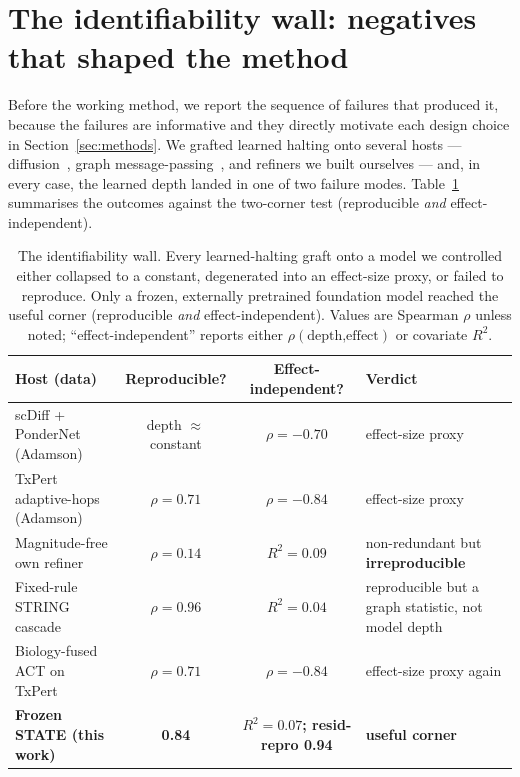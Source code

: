 \documentclass[11pt]{article}
\let\mathrho\rho
\renewcommand{\rho}{\ensuremath{\mathrho}}
\begin{document}
\section{The identifiability wall: negatives that shaped the method}
\label{sec:wall}

Before the working method, we report the sequence of failures that produced it, because the
failures are informative and they directly motivate each design choice in
Section~\ref{sec:methods}. We grafted learned halting onto several hosts --- diffusion~\cite{scdiff2024}, graph message-passing~\cite{txpert2026,gears2023}, and refiners we built ourselves --- and, in every case,
the learned depth landed in one of two failure modes. Table~\ref{tab:wall} summarises the
outcomes against the two-corner test (reproducible \emph{and} effect-independent).

\begin{table}[t]
\centering
\caption{The identifiability wall. Every learned-halting graft onto a model we controlled either
collapsed to a constant, degenerated into an effect-size proxy, or failed to reproduce. Only a
frozen, externally pretrained foundation model reached the useful corner
(reproducible \emph{and} effect-independent). Values are Spearman \rho{} unless noted;
``effect-independent'' reports either $\rho(\text{depth,effect})$ or covariate $R^2$.}
\label{tab:wall}
\begin{tabular}{lccl}
\toprule
\textbf{Host (data)} & \textbf{Reproducible?} & \textbf{Effect-independent?} & \textbf{Verdict} \\
\midrule
scDiff + PonderNet (Adamson)      & depth $\approx$ constant & \rho{}$=-0.70$ & effect-size proxy \\
TxPert adaptive-hops (Adamson)    & \rho{}$=0.71$            & \rho{}$=-0.84$ & effect-size proxy \\
Magnitude-free own refiner        & \rho{}$=0.14$            & $R^2=0.09$      & non-redundant but \textbf{irreproducible} \\
Fixed-rule STRING cascade         & \rho{}$=0.96$            & $R^2=0.04$      & reproducible but a graph statistic, not model depth \\
Biology-fused ACT on TxPert       & \rho{}$=0.71$            & \rho{}$=-0.84$ & effect-size proxy again \\
\textbf{Frozen STATE (this work)} & \textbf{0.84}           & \textbf{$R^2=0.07$; resid-repro 0.94} & \textbf{useful corner} \\
\bottomrule
\end{tabular}
\end{table}
\end{document}
